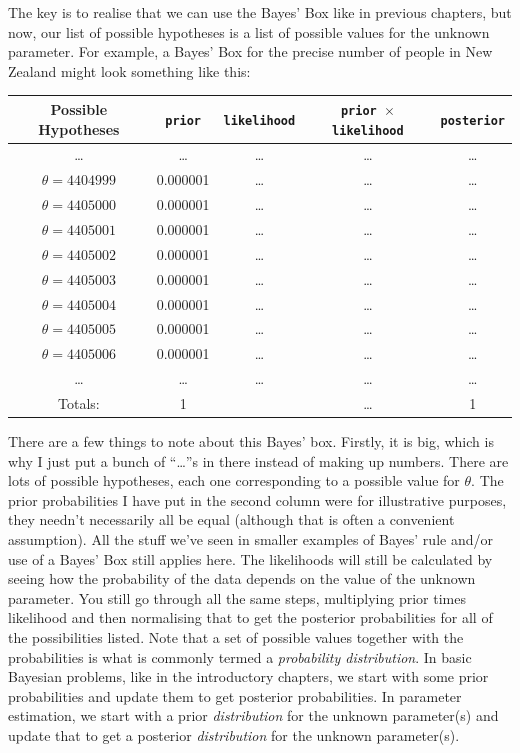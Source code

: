 The key is to realise that we can use the Bayes' Box like in previous chapters,
but now, our list of possible hypotheses is a list of possible values for
the unknown parameter. For example, a Bayes' Box for the precise number of
people in New Zealand might look something like this:
\begin{table}[h!]
\begin{center}
\begin{tabular}{|c|c|c|c|c|}
\hline
{\bf Possible Hypotheses} & {\tt prior} & {\tt likelihood} &
{\tt prior $\times$ likelihood} & {\tt posterior}\\
\hline
\ldots & \ldots & \ldots & \ldots & \ldots\\
$\theta = 4404999$ & 0.000001 & \ldots   & \ldots  & \ldots\\
$\theta = 4405000$ & 0.000001 & \ldots   & \ldots  & \ldots\\
$\theta = 4405001$ & 0.000001 & \ldots   & \ldots  & \ldots\\
$\theta = 4405002$ & 0.000001 & \ldots   & \ldots  & \ldots\\
$\theta = 4405003$ & 0.000001 & \ldots   & \ldots  & \ldots\\
$\theta = 4405004$ & 0.000001 & \ldots   & \ldots  & \ldots\\
$\theta = 4405005$ & 0.000001 & \ldots   & \ldots  & \ldots\\
$\theta = 4405006$ & 0.000001 & \ldots   & \ldots  & \ldots\\
\ldots & \ldots & \ldots & \ldots & \ldots\\
\hline
Totals: & 1 & & \ldots & 1\\
\hline
\end{tabular}
\end{center}
\end{table}

There are a few things to note about this Bayes' box. Firstly, it is big, which
is why I just put a bunch of ``\ldots''s in there instead of making up numbers.
There are lots of possible hypotheses, each one corresponding to a possible value
for
$\theta$. The prior probabilities I have put in the second column were for
illustrative purposes, they needn't necessarily all be equal (although that is
often a convenient assumption). All the
stuff we've seen in smaller examples of Bayes' rule and/or use of a Bayes' Box
still applies here. The likelihoods will
still be calculated by seeing how the probability of the data depends on the
value of the unknown parameter. You still go through all the same steps,
multiplying prior times likelihood and then normalising that to get the
posterior probabilities for all of the possibilities listed. Note that a set
of possible values together with the probabilities is what is commonly termed
a {\it probability distribution}. In basic Bayesian problems, like in the
introductory chapters, we start with some prior probabilities and update them
to get posterior probabilities. In parameter estimation, we start with a prior
{\it distribution} for the unknown parameter(s) and update that to get a
posterior {\it distribution} for the unknown parameter(s).


